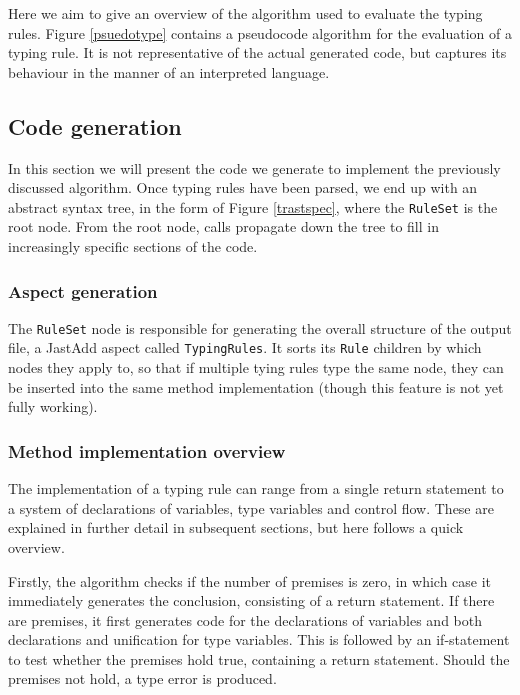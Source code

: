 \documentclass[nofilelist]{cslthse-msc}
\newcommand{\CR}[1]{\textcolor{green!60!black}{[\textbf{CR}:#1]}}
\begin{document}
Here we aim to give an overview of the algorithm used to evaluate the typing rules.
Figure \ref{psuedotype} contains a pseudocode algorithm for the evaluation of a typing rule.
It is not representative of the actual generated code, but captures its behaviour in the manner of an interpreted language.

\subsection{Code generation}\label{codegeneration}

In this section we will present the code we generate to implement the previously discussed algorithm.
Once typing rules have been parsed, we end up with an abstract syntax tree, in the form of Figure \ref{trastspec}, where the \lstinline{RuleSet} is the root node.
From the root node, calls propagate down the tree to fill in increasingly specific sections of the code.




\subsubsection{Aspect generation}
The \lstinline{RuleSet} node is responsible for generating the overall structure of the output file, a JastAdd aspect called \lstinline{TypingRules}.
It sorts its \lstinline{Rule} children by which nodes they apply to, so that if multiple tying rules type the same node, they can be inserted into the same method implementation (though this feature is not yet fully working).

\subsubsection{Method implementation overview}
The implementation of a typing rule can range from a single return statement to a system of declarations of variables, type variables and control flow.
These are explained in further detail in subsequent sections, but here follows a quick overview.

Firstly, the algorithm checks if the number of premises is zero, in which case it immediately generates the conclusion, consisting of a return statement.
If there are premises, it first generates code for the declarations of variables and both declarations and unification for type variables.
This is followed by an if-statement to test whether the premises hold true, containing a return statement.
Should the premises not hold, a type error is produced.
\end{document}
